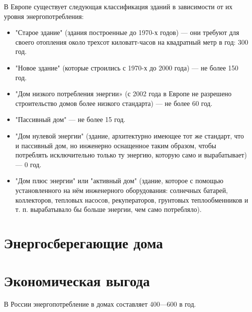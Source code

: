 В Европе существует следующая классификация зданий в зависимости от их уровня энергопотребления:
\begin{itemize}
    \item "Старое здание" (здания построенные до 1970-х годов) — они требуют для своего отопления около трехсот киловатт-часов на квадратный метр в год: 300 \kwpm год.
    \item "Новое здание" (которые строились с 1970-х до 2000 года) — не более 150 \kwpm год.
    \item "Дом низкого потребления энергии» (с 2002 года в Европе не разрешено строительство домов более низкого стандарта) — не более 60 \kwpm год.
    \item "Пассивный дом" — не более 15 \kwpm год.
    \item "Дом нулевой энергии" (здание, архитектурно имеющее тот же стандарт, что и пассивный дом, но инженерно оснащенное таким образом, чтобы потреблять исключительно только ту энергию, которую само и вырабатывает) — 0 \kwpm год.
    \item "Дом плюс энергии" или "активный дом" (здание, которое с помощью установленного на нём инженерного оборудования: солнечных батарей, коллекторов, тепловых насосов, рекуператоров, грунтовых теплообменников и т. п. вырабатывало бы больше энергии, чем само потребляло).

\end{itemize}

\section{Энергосберегающие дома}


\section{Экономическая выгода}
	В России энергопотребление в домах составляет 400—600 \kwpm в год.
